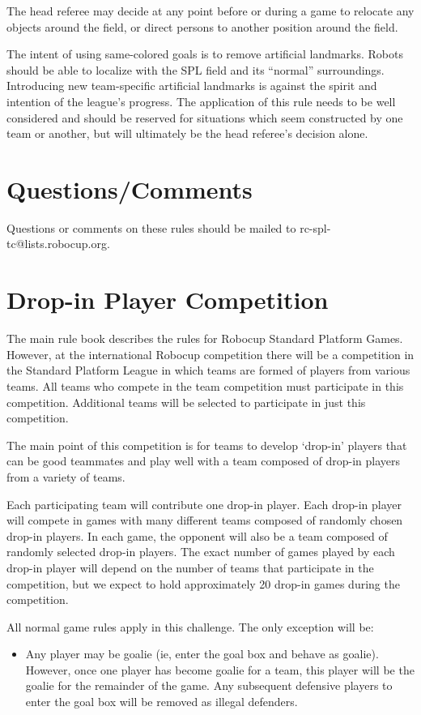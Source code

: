 \documentclass[12pt]{article}
\begin{document}
The head referee may decide at any point before or during a game to relocate any objects around the field, or direct persons to another position around the field.

The intent of using same-colored goals is to remove artificial landmarks.
Robots should be able to localize with the SPL field and its ``normal'' surroundings.
Introducing new team-specific artificial landmarks is against the spirit and intention of the league's progress.
The application of this rule needs to be well considered and should be reserved for situations which seem constructed by one team or another, but will ultimately be the head referee's decision alone.

\section{Questions/Comments}

Questions or comments on these rules should be mailed to rc-spl-tc@lists.robocup.org.


\newpage


\appendix
\section{Drop-in Player Competition}
\label{sec:drop-in}
The main rule book describes the rules for Robocup Standard Platform Games.  However, at the international Robocup competition there will be a competition in the Standard Platform League in which teams are formed of players from various teams.  All teams who compete in the team competition must participate in this competition.  Additional teams will be selected to participate in just this competition.

The main point of this competition is for teams to develop `drop-in' players that can be good teammates and play well with a team composed of drop-in players from a variety of teams.

Each participating team will contribute one drop-in player.  Each drop-in player will compete in games with many different teams composed of randomly chosen drop-in players.  In each game, the opponent will also be a team composed of randomly selected drop-in players.  The exact number of games played by each drop-in player will depend on the number of teams that participate in the competition, but we expect to hold approximately 20 drop-in games during the competition.

All normal game rules apply in this challenge.  The only exception will be:
\begin{itemize}
\item Any player may be goalie (ie, enter the goal box and behave as goalie).  However, once one player has become goalie for a team, this player will be the goalie for the remainder of the game.  Any subsequent defensive players to enter the goal box will be removed as illegal defenders. 
\end{itemize}
\end{document}
